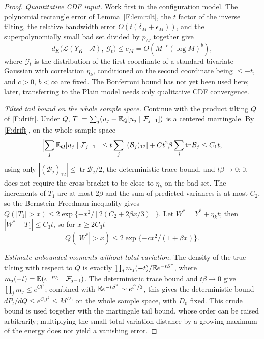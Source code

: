 \begin{proof}
\emph{Quantitative CDF input.} Work first in the configuration model. The polynomial rectangle
error of Lemma~\ref{F:lem:tilt}, the $t$ factor of the inverse tilting, the relative bandwidth
error $O(t(\delta_M+\epsilon_M))$, and the superpolynomially small bad set divided by $p_M$
together give
\begin{equation}
d_K\bigl(\mathcal L(Y_K\mid \mathcal A),\ \mathcal G_t\bigr)\le e_M=O(M^{-c}(\log M)^b),\label{F:dK}
\end{equation}
where $\mathcal G_t$ is the distribution of the first coordinate of a standard bivariate Gaussian
with correlation $\eta_k$, conditioned on the second coordinate being $\le-t$, and $c>0$,
$b<\infty$ are fixed. The Bonferroni bound has not yet been used here; later, transferring to the
Plain model needs only qualitative CDF convergence.

\emph{Tilted tail bound on the whole sample space.} Continue with the product tilting $Q$ of
\eqref{F:drift}. Under $Q$, $T_1=\sum_j(u_j-\mathbb E_Q[u_j\mid\mathcal F_{j-1}])$ is a centered
martingale. By \eqref{F:drift}, on the whole sample space
\[
\Bigl|\sum_j\mathbb E_Q[u_j\mid\mathcal F_{j-1}]\Bigr|\le t\sum_j|(\mathcal B_j)_{12}|+Ct^2\beta\sum_j\operatorname{tr}\mathcal B_j\le C_1t,
\]
using only $|(\mathcal B_j)_{12}|\le\operatorname{tr}\mathcal B_j/2$, the deterministic trace
bound, and $t\beta\to0$; it does not require the cross bracket to be close to $\eta_k$ on the bad
set. The increments of $T_1$ are at most $2\beta$ and the sum of predicted variances is at most
$C_2$, so the Bernstein--Freedman inequality gives
$Q(|T_1|>x)\le2\exp\{-x^2/[2(C_2+2\beta x/3)]\}$. Let $W^*=Y^*+\eta_kt$; then
$|W^*-T_1|\le C_3t$, so for $x\ge2C_3t$
\begin{equation}
Q(|W^*|>x)\le2\exp\{-cx^2/(1+\beta x)\}.\label{F:Qtail}
\end{equation}

\emph{Estimate unbounded moments without total variation.} The density of the true tilting with
respect to $Q$ is exactly $\prod_jm_j(-t)/\mathbb E e^{-tS^*}$, where
$m_j(-t)=\mathbb E(e^{-tv_j}\mid\mathcal F_{j-1})$. The deterministic trace bound and $t\beta\to0$ give
$\prod_jm_j\le e^{Ct^2}$; combined with $\mathbb E e^{-tS^*}\sim e^{t^2/2}$, this gives the
deterministic bound $dP_t/dQ\le e^{C_4t^2}\le M^{D_0}$ on the whole sample space, with $D_0$
fixed. This crude bound is used together with the martingale tail bound, whose order can be raised
arbitrarily; multiplying the small total variation distance by a growing maximum of the energy
does not yield a vanishing error.


\end{proof}
